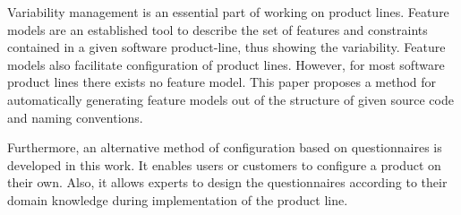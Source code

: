 Variability management is an essential part of working on product lines. Feature models are an established tool to describe the set of features and constraints contained in a given software product-line, thus showing the variability. Feature models also facilitate configuration of product lines. However, for most software product lines there exists no feature model. This paper proposes a method for automatically generating feature models out of the structure of given source code and naming conventions.

Furthermore, an alternative method of configuration based on questionnaires is developed in this work. It enables users or customers to configure a product on their own. Also, it allows experts to design the questionnaires according to their domain knowledge during implementation of the product line.